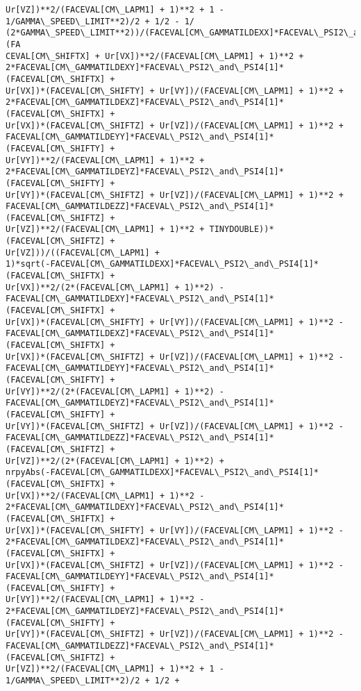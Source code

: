 \documentclass[landscape,letterpaper,10pt,english]{article}
\begin{document}
\begin{Verbatim}[commandchars=\\\{\}]
Ur[VZ])**2/(FACEVAL[CM\_LAPM1] + 1)**2 + 1 - 1/GAMMA\_SPEED\_LIMIT**2)/2 + 1/2 - 1/
(2*GAMMA\_SPEED\_LIMIT**2))/(FACEVAL[CM\_GAMMATILDEXX]*FACEVAL\_PSI2\_and\_PSI4[1]*(FA
CEVAL[CM\_SHIFTX] + Ur[VX])**2/(FACEVAL[CM\_LAPM1] + 1)**2 +
2*FACEVAL[CM\_GAMMATILDEXY]*FACEVAL\_PSI2\_and\_PSI4[1]*(FACEVAL[CM\_SHIFTX] +
Ur[VX])*(FACEVAL[CM\_SHIFTY] + Ur[VY])/(FACEVAL[CM\_LAPM1] + 1)**2 +
2*FACEVAL[CM\_GAMMATILDEXZ]*FACEVAL\_PSI2\_and\_PSI4[1]*(FACEVAL[CM\_SHIFTX] +
Ur[VX])*(FACEVAL[CM\_SHIFTZ] + Ur[VZ])/(FACEVAL[CM\_LAPM1] + 1)**2 +
FACEVAL[CM\_GAMMATILDEYY]*FACEVAL\_PSI2\_and\_PSI4[1]*(FACEVAL[CM\_SHIFTY] +
Ur[VY])**2/(FACEVAL[CM\_LAPM1] + 1)**2 +
2*FACEVAL[CM\_GAMMATILDEYZ]*FACEVAL\_PSI2\_and\_PSI4[1]*(FACEVAL[CM\_SHIFTY] +
Ur[VY])*(FACEVAL[CM\_SHIFTZ] + Ur[VZ])/(FACEVAL[CM\_LAPM1] + 1)**2 +
FACEVAL[CM\_GAMMATILDEZZ]*FACEVAL\_PSI2\_and\_PSI4[1]*(FACEVAL[CM\_SHIFTZ] +
Ur[VZ])**2/(FACEVAL[CM\_LAPM1] + 1)**2 + TINYDOUBLE))*(FACEVAL[CM\_SHIFTZ] +
Ur[VZ]))/((FACEVAL[CM\_LAPM1] +
1)*sqrt(-FACEVAL[CM\_GAMMATILDEXX]*FACEVAL\_PSI2\_and\_PSI4[1]*(FACEVAL[CM\_SHIFTX] +
Ur[VX])**2/(2*(FACEVAL[CM\_LAPM1] + 1)**2) -
FACEVAL[CM\_GAMMATILDEXY]*FACEVAL\_PSI2\_and\_PSI4[1]*(FACEVAL[CM\_SHIFTX] +
Ur[VX])*(FACEVAL[CM\_SHIFTY] + Ur[VY])/(FACEVAL[CM\_LAPM1] + 1)**2 -
FACEVAL[CM\_GAMMATILDEXZ]*FACEVAL\_PSI2\_and\_PSI4[1]*(FACEVAL[CM\_SHIFTX] +
Ur[VX])*(FACEVAL[CM\_SHIFTZ] + Ur[VZ])/(FACEVAL[CM\_LAPM1] + 1)**2 -
FACEVAL[CM\_GAMMATILDEYY]*FACEVAL\_PSI2\_and\_PSI4[1]*(FACEVAL[CM\_SHIFTY] +
Ur[VY])**2/(2*(FACEVAL[CM\_LAPM1] + 1)**2) -
FACEVAL[CM\_GAMMATILDEYZ]*FACEVAL\_PSI2\_and\_PSI4[1]*(FACEVAL[CM\_SHIFTY] +
Ur[VY])*(FACEVAL[CM\_SHIFTZ] + Ur[VZ])/(FACEVAL[CM\_LAPM1] + 1)**2 -
FACEVAL[CM\_GAMMATILDEZZ]*FACEVAL\_PSI2\_and\_PSI4[1]*(FACEVAL[CM\_SHIFTZ] +
Ur[VZ])**2/(2*(FACEVAL[CM\_LAPM1] + 1)**2) +
nrpyAbs(-FACEVAL[CM\_GAMMATILDEXX]*FACEVAL\_PSI2\_and\_PSI4[1]*(FACEVAL[CM\_SHIFTX] +
Ur[VX])**2/(FACEVAL[CM\_LAPM1] + 1)**2 -
2*FACEVAL[CM\_GAMMATILDEXY]*FACEVAL\_PSI2\_and\_PSI4[1]*(FACEVAL[CM\_SHIFTX] +
Ur[VX])*(FACEVAL[CM\_SHIFTY] + Ur[VY])/(FACEVAL[CM\_LAPM1] + 1)**2 -
2*FACEVAL[CM\_GAMMATILDEXZ]*FACEVAL\_PSI2\_and\_PSI4[1]*(FACEVAL[CM\_SHIFTX] +
Ur[VX])*(FACEVAL[CM\_SHIFTZ] + Ur[VZ])/(FACEVAL[CM\_LAPM1] + 1)**2 -
FACEVAL[CM\_GAMMATILDEYY]*FACEVAL\_PSI2\_and\_PSI4[1]*(FACEVAL[CM\_SHIFTY] +
Ur[VY])**2/(FACEVAL[CM\_LAPM1] + 1)**2 -
2*FACEVAL[CM\_GAMMATILDEYZ]*FACEVAL\_PSI2\_and\_PSI4[1]*(FACEVAL[CM\_SHIFTY] +
Ur[VY])*(FACEVAL[CM\_SHIFTZ] + Ur[VZ])/(FACEVAL[CM\_LAPM1] + 1)**2 -
FACEVAL[CM\_GAMMATILDEZZ]*FACEVAL\_PSI2\_and\_PSI4[1]*(FACEVAL[CM\_SHIFTZ] +
Ur[VZ])**2/(FACEVAL[CM\_LAPM1] + 1)**2 + 1 - 1/GAMMA\_SPEED\_LIMIT**2)/2 + 1/2 +

\end{Verbatim}
\end{document}
